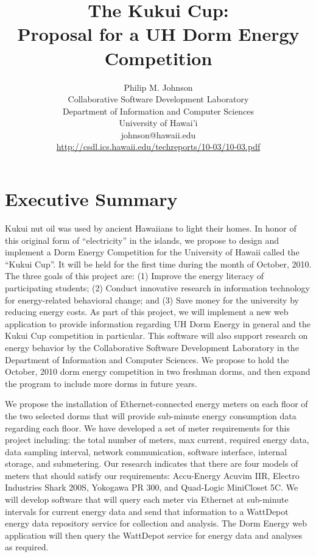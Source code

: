 \documentclass[11pt]{article}
\begin{document}
\title{The Kukui Cup: \\Proposal for a UH Dorm Energy Competition}

\author{Philip M. Johnson \\
Collaborative Software Development Laboratory \\
Department of Information and Computer Sciences \\
University of Hawai'i \\
johnson@hawaii.edu \\
\url{http://csdl.ics.hawaii.edu/techreports/10-03/10-03.pdf}
}

\maketitle

\tableofcontents
\newpage

\section{Executive Summary}

Kukui nut oil was used by ancient Hawaiians to light their homes.  In honor
of this original form of ``electricity'' in the islands, we propose to design and
implement a Dorm Energy Competition for the University of Hawaii called the
``Kukui Cup''.   It will be held for the first time during the month of October,
2010.  The three goals of this project are: (1) Improve the energy literacy
of participating students; (2) Conduct innovative research in information
technology for energy-related behavioral change; and (3) Save money for the
university by reducing energy costs.  As part of this project, we will
implement a new web application to provide information regarding UH Dorm
Energy in general and the Kukui Cup competition in particular.  This
software will also support research on energy behavior by the Collaborative
Software Development Laboratory in the Department of Information and
Computer Sciences.  We propose to hold the October, 2010 dorm energy
competition in two freshman dorms, and then expand the program to include
more dorms in future years.

We propose the installation of Ethernet-connected energy meters on each
floor of the two selected dorms that will provide sub-minute energy
consumption data regarding each floor.  We have developed a set of meter
requirements for this project including: the total number of meters, max
current, required energy data, data sampling interval, network
communication, software interface, internal storage, and submetering.  Our
research indicates that there are four models of meters that should satisfy
our requirements: Accu-Energy Acuvim IIR, Electro Industries Shark 200S,
Yokogawa PR 300, and Quad-Logic MiniCloset 5C.  We will develop software
that will query each meter via Ethernet at sub-minute intervals for current
energy data and send that information to a WattDepot energy data repository
service for collection and analysis.  The Dorm Energy web application will
then query the WattDepot service for energy data and analyses as required.
\end{document}
